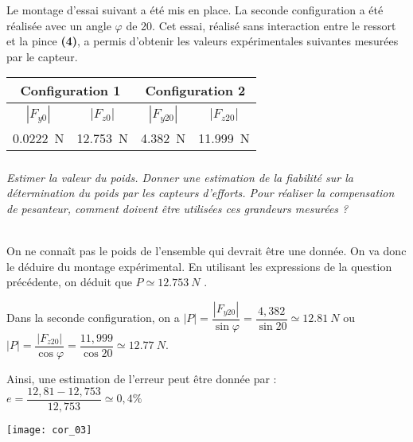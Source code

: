 \begin{multicols}{2}
Le montage d’essai suivant a été mis en place. La seconde configuration a été réalisée avec un angle $\varphi$ de 20\degres. Cet essai, réalisé sans interaction entre le ressort et la pince \textbf{(4)}, a permis d’obtenir les valeurs expérimentales suivantes mesurées par le
capteur.
\begin{center}
\begin{tabular}{|c|c|c|c|}
\hline
\multicolumn{2}{|c|}{Configuration 1}&\multicolumn{2}{c|}{Configuration 2}\\ \hline
$|F_{y0}|$ & $|F_{z0}|$ & $|F_{y20}|$ & $|F_{z20}|$ \\ \hline
\SI{0,0222}{N} & \SI{12,753}{N} & \SI{4,382}{N} & \SI{11,999}{N} \\ \hline
\end{tabular}
\end{center}

\fi
\subparagraph{}
\textit{Estimer la valeur du poids. Donner une estimation de la fiabilité sur la détermination du poids par les capteurs d'efforts. 
Pour réaliser la compensation de pesanteur, comment doivent être utilisées ces grandeurs mesurées ?}
\ifprof
\begin{corrige} ~\\
On ne connaît pas le poids de l'ensemble qui devrait être une donnée. On va donc le déduire du montage expérimental. En utilisant les expressions de la question précédente, on déduit que $P\simeq  \SI{12,753}{N}$ . 

Dans la seconde configuration, on a $|P|=\dfrac{|F_{y20}|}{\sin\varphi}=\dfrac{4,382}{\sin 20}\simeq \SI{12,81}{N}$ ou  $|P|=\dfrac{|F_{z20}|}{\cos\varphi}=\dfrac{11,999}{\cos 20}\simeq \SI{12,77}{N}$.

Ainsi, une estimation de l'erreur peut être donnée par : $e=\dfrac{12,81-12,753}{12,753}\simeq0,4\%$

\begin{center}
\texttt{[image: cor\_03]}
\end{center}

%



\end{corrige}
\end{multicols}
